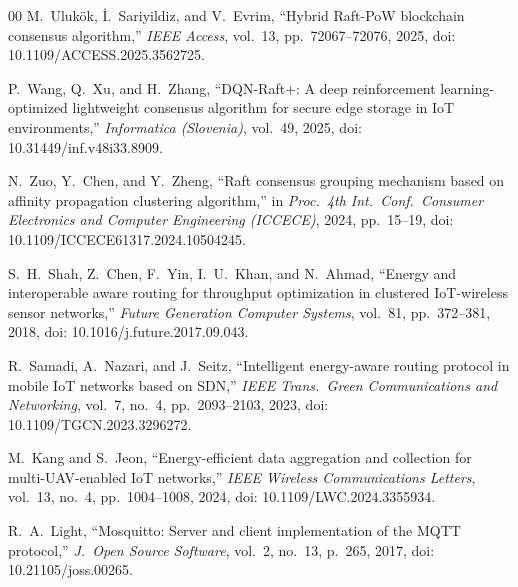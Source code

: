 \documentclass[conference]{IEEEtran}
\begin{document}
\begin{thebibliography}{00}
M.~Uluk{\"o}k, {\.I}.~Sariyildiz, and V.~Evrim, ``Hybrid Raft-PoW
blockchain consensus algorithm,'' \emph{IEEE Access}, vol.~13,
pp.~72067--72076, 2025, doi: 10.1109/ACCESS.2025.3562725.

P.~Wang, Q.~Xu, and H.~Zhang, ``DQN-Raft+: A deep reinforcement
learning-optimized lightweight consensus algorithm for secure edge
storage in IoT environments,'' \emph{Informatica (Slovenia)},
vol.~49, 2025, doi: 10.31449/inf.v48i33.8909.

N.~Zuo, Y.~Chen, and Y.~Zheng, ``Raft consensus grouping mechanism
based on affinity propagation clustering algorithm,'' in \emph{Proc.\
4th Int.\ Conf.\ Consumer Electronics and Computer Engineering
(ICCECE)}, 2024, pp.~15--19, doi: 10.1109/ICCECE61317.2024.10504245.

S.~H.~Shah, Z.~Chen, F.~Yin, I.~U.~Khan, and N.~Ahmad, ``Energy and
interoperable aware routing for throughput optimization in clustered
IoT-wireless sensor networks,'' \emph{Future Generation Computer
Systems}, vol.~81, pp.~372--381, 2018, doi:
10.1016/j.future.2017.09.043.

R.~Samadi, A.~Nazari, and J.~Seitz, ``Intelligent energy-aware routing
protocol in mobile IoT networks based on SDN,'' \emph{IEEE Trans.\
Green Communications and Networking}, vol.~7, no.~4, pp.~2093--2103,
2023, doi: 10.1109/TGCN.2023.3296272.

M.~Kang and S.~Jeon, ``Energy-efficient data aggregation and
collection for multi-UAV-enabled IoT networks,'' \emph{IEEE Wireless
Communications Letters}, vol.~13, no.~4, pp.~1004--1008, 2024, doi:
10.1109/LWC.2024.3355934.

R.~A.~Light, ``Mosquitto: Server and client implementation of the MQTT
protocol,'' \emph{J.\ Open Source Software}, vol.~2, no.~13, p.~265,
2017, doi: 10.21105/joss.00265.

\end{thebibliography}
\end{document}
